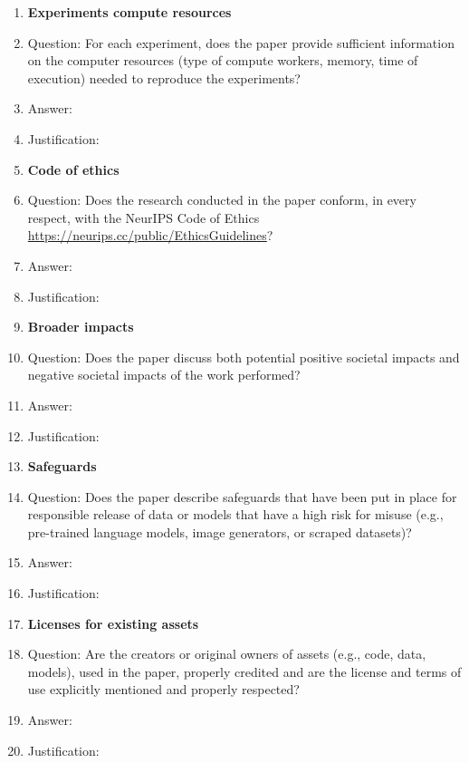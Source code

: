 \begin{enumerate}
\item {\bf Experiments compute resources}
    \item[] Question: For each experiment, does the paper provide sufficient information on the computer resources (type of compute workers, memory, time of execution) needed to reproduce the experiments?
    \item[] Answer: \answerYes{}
    \item[] Justification: 

\item {\bf Code of ethics}
    \item[] Question: Does the research conducted in the paper conform, in every respect, with the NeurIPS Code of Ethics \url{https://neurips.cc/public/EthicsGuidelines}?
    \item[] Answer: \answerYes{}
    \item[] Justification: 

\item {\bf Broader impacts}
    \item[] Question: Does the paper discuss both potential positive societal impacts and negative societal impacts of the work performed?
    \item[] Answer: \answerNo{}
    \item[] Justification: 

\item {\bf Safeguards}
    \item[] Question: Does the paper describe safeguards that have been put in place for responsible release of data or models that have a high risk for misuse (e.g., pre-trained language models, image generators, or scraped datasets)?
    \item[] Answer: \answerNA{}
    \item[] Justification: 

\item {\bf Licenses for existing assets}
    \item[] Question: Are the creators or original owners of assets (e.g., code, data, models), used in the paper, properly credited and are the license and terms of use explicitly mentioned and properly respected?
    \item[] Answer: \answerNo{}
    \item[] Justification: 


\end{enumerate}
